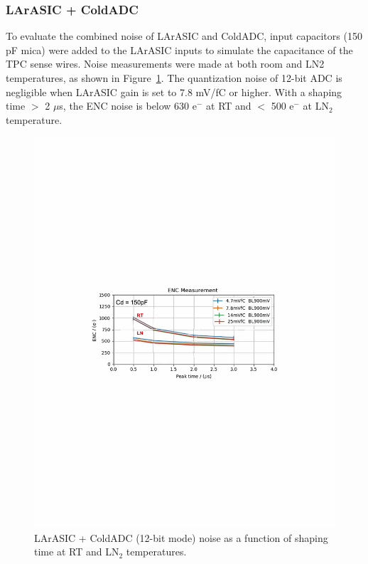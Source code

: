 \subsubsection{LArASIC + ColdADC}
To evaluate the combined noise of LArASIC and ColdADC, input capacitors (150 pF mica) were added to the LArASIC 
inputs to simulate the capacitance of the TPC sense wires. Noise measurements were made at both room and LN2 
temperatures, as shown in Figure~\ref{fig:noise_fullchain}.  
The quantization noise of 12-bit ADC is negligible when LArASIC gain is set to 7.8 mV/fC or higher.
With a shaping time $>$ 2 $\mu$s, the ENC noise is below 630 e$^-$ at RT and $<$ 500 e$^-$ at LN$_2$ temperature.
\begin{figure}[h!]
\centering
  \includegraphics[width=0.8\linewidth]{figures/noise_fullchain.pdf}
  \caption{LArASIC + ColdADC (12-bit mode) noise as a function of shaping time at RT and LN$_2$ temperatures.}
  \label{fig:noise_fullchain}
\end{figure}

